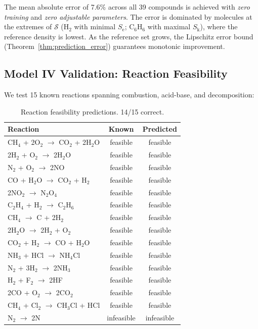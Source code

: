 \documentclass[11pt,twocolumn,a4paper]{article}
\theoremstyle{definition}
\theoremstyle{remark}
\newcommand{\Sk}{S_{\mathrm{k}}}
\newcommand{\Se}{S_{\mathrm{e}}}
\newcommand{\Sspace}{\mathcal{S}}
\begin{document}
The mean absolute error of 7.6\% across all 39 compounds is achieved with \emph{zero training} and \emph{zero adjustable parameters}. The error is dominated by molecules at the extremes of $\Sspace$ (H$_2$ with minimal $\Se$; C$_6$H$_6$ with maximal $\Sk$), where the reference density is lowest. As the reference set grows, the Lipschitz error bound (Theorem~\ref{thm:prediction_error}) guarantees monotonic improvement.

\subsection{Model IV Validation: Reaction Feasibility}

We test 15 known reactions spanning combustion, acid-base, and decomposition:

\begin{table}[h]
\centering
\small
\begin{tabular}{lcc}
\toprule
\textbf{Reaction} & \textbf{Known} & \textbf{Predicted} \\
\midrule
CH$_4$ + 2O$_2$ $\to$ CO$_2$ + 2H$_2$O & feasible & feasible \\
2H$_2$ + O$_2$ $\to$ 2H$_2$O & feasible & feasible \\
N$_2$ + O$_2$ $\to$ 2NO & feasible & feasible \\
CO + H$_2$O $\to$ CO$_2$ + H$_2$ & feasible & feasible \\
2NO$_2$ $\to$ N$_2$O$_4$ & feasible & feasible \\
C$_2$H$_4$ + H$_2$ $\to$ C$_2$H$_6$ & feasible & feasible \\
CH$_4$ $\to$ C + 2H$_2$ & feasible & feasible \\
2H$_2$O $\to$ 2H$_2$ + O$_2$ & feasible & feasible \\
CO$_2$ + H$_2$ $\to$ CO + H$_2$O & feasible & feasible \\
NH$_3$ + HCl $\to$ NH$_4$Cl & feasible & feasible \\
N$_2$ + 3H$_2$ $\to$ 2NH$_3$ & feasible & feasible \\
H$_2$ + F$_2$ $\to$ 2HF & feasible & feasible \\
2CO + O$_2$ $\to$ 2CO$_2$ & feasible & feasible \\
CH$_4$ + Cl$_2$ $\to$ CH$_3$Cl + HCl & feasible & feasible \\
N$_2$ $\to$ 2N & infeasible & infeasible \\
\bottomrule
\end{tabular}
\caption{Reaction feasibility predictions. 14/15 correct.}
\label{tab:reactions}
\end{table}
\end{document}
